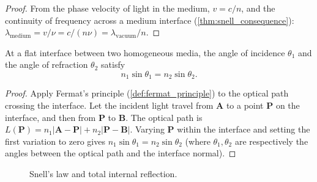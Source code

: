 \begin{proof}
From the phase velocity of light in the medium, $v = c/n$, and the continuity of frequency across a medium interface (\cref{thm:snell_consequence}): $\lambda_{\text{medium}} = v/\nu = c/(n\nu) = \lambda_{\text{vacuum}}/n$.
\end{proof}

\begin{theorem}\label{thm:snell_consequence}
At a flat interface between two homogeneous media, the angle of incidence $\theta_1$ and the angle of refraction $\theta_2$ satisfy
\[
n_1\sin\theta_1 = n_2\sin\theta_2.
\]
\end{theorem}

\begin{proof}
Apply Fermat's principle (\cref{def:fermat_principle}) to the optical path crossing the interface. Let the incident light travel from $\mathbf{A}$ to a point $\mathbf{P}$ on the interface, and then from $\mathbf{P}$ to $\mathbf{B}$. The optical path is $L(\mathbf{P}) = n_1|\mathbf{A}-\mathbf{P}| + n_2|\mathbf{P}-\mathbf{B}|$. Varying $\mathbf{P}$ within the interface and setting the first variation to zero gives $n_1\sin\theta_1 = n_2\sin\theta_2$ (where $\theta_1,\theta_2$ are respectively the angles between the optical path and the interface normal).
\end{proof}

\begin{figure}[htbp]
\centering
{}
\caption{Snell's law and total internal reflection.}
\label{fig:snell}
\end{figure}

